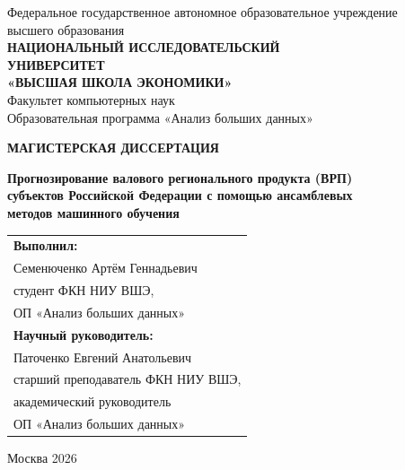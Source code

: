 \documentclass[12pt,a4paper]{article}
\begin{document}
\begin{titlepage}
\begin{center}
{\small Федеральное государственное автономное образовательное учреждение\\
высшего образования\\[4pt]
\textbf{НАЦИОНАЛЬНЫЙ ИССЛЕДОВАТЕЛЬСКИЙ\\
УНИВЕРСИТЕТ\\
«ВЫСШАЯ ШКОЛА ЭКОНОМИКИ»}\\[8pt]
Факультет компьютерных наук\\
Образовательная программа «Анализ больших данных»}

\vspace{3cm}

{\Large\textbf{МАГИСТЕРСКАЯ ДИССЕРТАЦИЯ}}

\vspace{1cm}

{\large\textbf{Прогнозирование валового регионального продукта (ВРП)\\
субъектов Российской Федерации с помощью ансамблевых\\
методов машинного обучения}}

\vspace{3cm}

\begin{flushright}
\begin{tabular}{l}
\textbf{Выполнил:}\\
Семенюченко Артём Геннадьевич\\
студент ФКН НИУ ВШЭ,\\
ОП «Анализ больших данных»\\[12pt]
\textbf{Научный руководитель:}\\
Паточенко Евгений Анатольевич\\
старший преподаватель ФКН НИУ ВШЭ,\\
академический руководитель\\
ОП «Анализ больших данных»
\end{tabular}
\end{flushright}

\vfill
Москва 2026
\end{center}
\end{titlepage}

\newpage
\end{document}
